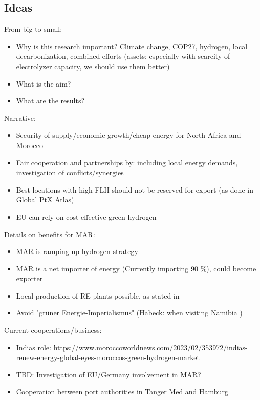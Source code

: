 
\subsection{Ideas}
From big to small:
\begin{itemize}
    \item Why is this research important? Climate change, COP27, hydrogen, local decarbonization, combined efforts (assets: especially with scarcity of electrolyzer capacity, we should use them better)
    \item What is the aim?
    \item What are the results?
\end{itemize}
Narrative: 
\begin{itemize}
    \item Security of supply/economic growth/cheap energy for North Africa and Morocco
    \item Fair cooperation and partnerships by: including local energy demands, investigation of conflicts/synergies
    \item Best locations with high FLH should not be reserved for export (as done in Global PtX Atlas)
    \item EU can rely on cost-effective green hydrogen
\end{itemize}

Details on benefits for MAR:
\begin{itemize}
    \item MAR is ramping up hydrogen strategy
    \item MAR is a net importer of energy (Currently importing 90 \%), could become exporter
    \item Local production of RE plants possible, as stated in \cite{Ersoy2022}
    \item Avoid "gr{\"u}ner Energie-Imperialismus" (Habeck: when visiting Namibia ) \cite{HabeckEnergieimperialismus}
\end{itemize}

Current cooperations/business:
\begin{itemize}
    \item Indias role: https://www.moroccoworldnews.com/2023/02/353972/indias-renew-energy-global-eyes-moroccos-green-hydrogen-market
    \item TBD: Investigation of EU/Germany involvement in MAR?
    \item Cooperation between port authorities in Tanger Med and Hamburg
\end{itemize}


